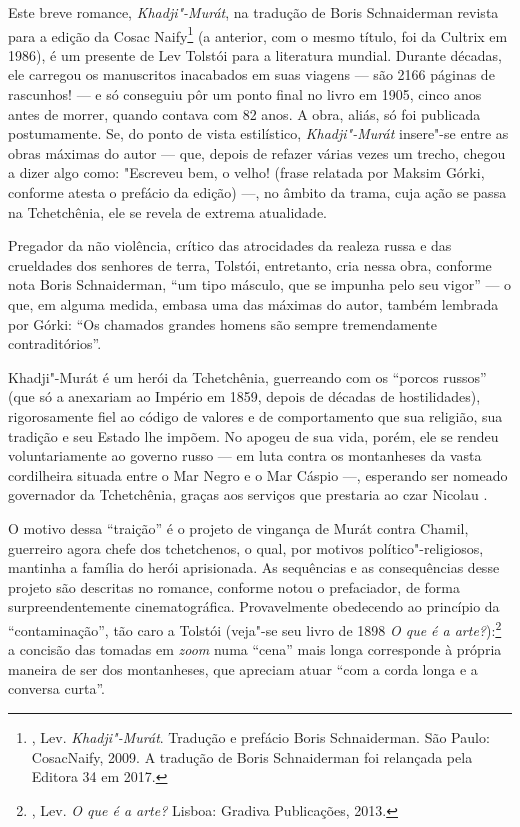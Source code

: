 Este breve romance, \emph{Khadji"-Murát}, na tradução de Boris
Schnaiderman revista para a edição da Cosac Naify\footnote{,
  Lev. \emph{Khadji"-Murát}. Tradução e prefácio Boris Schnaiderman. São
  Paulo: CosacNaify, 2009. A tradução de Boris Schnaiderman foi
  relançada pela Editora 34 em 2017.} (a anterior, com o mesmo título,
foi da Cultrix em 1986), é um presente de Lev Tolstói para a literatura
mundial. Durante décadas, ele carregou os manuscritos inacabados em suas
viagens --- são 2166 páginas de rascunhos! --- e só conseguiu pôr um
ponto final no livro em 1905, cinco anos antes de morrer, quando contava
com 82 anos. A obra, aliás, só foi publicada postumamente. Se, do ponto
de vista estilístico, \emph{Khadji"-Murát} insere"-se entre as
obras máximas do autor --- que, depois de refazer várias vezes um trecho,
chegou a dizer algo como: "Escreveu bem, o velho! (frase relatada por
Maksim Górki, conforme atesta o prefácio da edição) ---, no âmbito da
trama, cuja ação se passa na Tchetchênia, ele se revela de extrema
atualidade.

Pregador da não violência, crítico das atrocidades da realeza russa e
das crueldades dos senhores de terra, Tolstói, entretanto, cria nessa
obra, conforme nota Boris Schnaiderman, ``um tipo másculo, que se impunha
pelo seu vigor'' --- o que, em alguma medida, embasa uma das máximas do
autor, também lembrada por Górki: ``Os chamados grandes homens são sempre
tremendamente contraditórios''.

Khadji"-Murát é um herói da Tchetchênia, guerreando com os ``porcos
russos'' (que só a anexariam ao Império em 1859, depois de décadas de
hostilidades), rigorosamente fiel ao código de valores e de
comportamento que sua religião, sua tradição e seu Estado lhe impõem. No
apogeu de sua vida, porém, ele se rendeu voluntariamente ao governo
russo --- em luta contra os montanheses da vasta cordilheira situada
entre o Mar Negro e o Mar Cáspio ---, esperando ser nomeado governador da
Tchetchênia, graças aos serviços que prestaria ao czar Nicolau .

O motivo dessa ``traição'' é o projeto de vingança de Murát contra Chamil,
guerreiro agora chefe dos tchetchenos, o qual, por motivos
político"-religiosos, mantinha a família do herói aprisionada. As
sequências e as consequências desse projeto são descritas no romance,
conforme notou o prefaciador, de forma surpreendentemente
cinematográfica. Provavelmente obedecendo ao princípio da
``contaminação'', tão caro a Tolstói (veja"-se seu livro de 1898 \emph{O
que é a arte?}):\footnote{, Lev. \emph{O que é a arte?} Lisboa:
  Gradiva Publicações, 2013.} a concisão das tomadas em \emph{zoom}
numa ``cena'' mais longa corresponde à própria maneira de ser dos
montanheses, que apreciam atuar ``com a corda longa e a conversa curta''.

